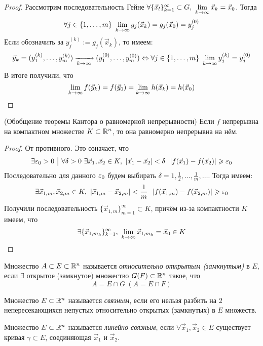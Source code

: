 \begin{proof}
	Рассмотрим последовательность Гейне $\forall \{\vec{x}_l\}_{k = 1}^\infty \subset G,\ \liml_{k \to \infty} \vec{x}_k = \vec{x}_0$. Тогда
	\[
		\forall j \in \{1, \ldots, m\}\ \lim\limits_{k \to \infty} g_j(\vec{x}_k) = g_j(\vec{x}_0) = y_j^{(0)}
	\]
	Если обозначить за $y_j^{(k)} := g_j(\vec{x}_k)$, то имеем:
	\[
		\vec{y}_k = (y_1^{(k)}, \ldots, y_m^{(k)}) \xrightarrow[k \to \infty]{} (y_1^{(0)}, \ldots, y_m^{(0)}) \Leftrightarrow \forall j \in \{1, \ldots, m\}\ \lim\limits_{k \to \infty} y_j^{(k)} = y_j^{(0)}
	\]
	В итоге получили, что
	\[
		\lim\limits_{k \to \infty} f(\vec{y}_k) = f(\vec{y}_0) = \lim\limits_{k \to \infty} h(\vec{x}_k) = h(\vec{x}_0)
	\]
\end{proof}

\begin{theorem} (Обобщение теоремы Кантора о равномерной непрерывности)
	Если $f$ непрерывна на компактном множестве $K \subset \mathbb{R}^n$, то она равномерно непрерывна на нём.
\end{theorem}

\begin{proof}
	От противного. Это означает, что
	\[
		\exists \varepsilon_0 > 0 \ \big|\  \forall \delta > 0\ \exists \vec{x}_1, \vec{x}_2 \in K,\ |\vec{x}_1 - \vec{x}_2| < \delta\ \ |f(\vec{x}_1) - f(\vec{x}_2)| \geqslant \varepsilon_0
	\]
	Последовательно для данного $\varepsilon_0$ будем выбирать $\delta = 1, \frac{1}{2}, \ldots, \frac{1}{m}, \ldots$. Тогда имеем:
	\[
		\exists \vec{x}_{1, m}, \vec{x}_{2, m} \in K,\ |\vec{x}_{1, m} - \vec{x}_{2, m}| < \frac{1}{m}\ \ |f(\vec{x}_{1, m}) - f(\vec{x}_{2, m})| \geqslant \varepsilon_0
	\]
	Получили последовательность $\{\vec{x}_{1, m}\}_{m = 1}^\infty \subset K$, причём из-за компактности $K$ имеем, что
	\[
		\exists \{\vec{x}_{1, m_k}\}_{k = 1}^\infty,\ \lim\limits_{k \to \infty} \vec{x}_{1, m_k} = \vec{x}_0 \in K
	\]
\end{proof}

\begin{definition}
	Множество $A \subset E \subset \mathbb{R}^n$ называется \textit{относительно открытым (замкнутым)} в $E$, если $\exists$ открытое (замкнутое) множество $G (F) \subset \mathbb{R}^n$ такое, что
	\[
		A = E \cap G\ (A = E \cap F)
	\]
\end{definition}

\begin{definition}
	Множество $E \subset \mathbb{R}^n$ называется \textit{связным}, если его нельзя разбить на 2 непересекающихся непустых относительно открытых (замкнутых) в $E$ множеств.
\end{definition}

\begin{definition}
	Множество $E \subset \mathbb{R}^n$ называется \textit{линейно связным}, если $\forall \vec{x}_1, \vec{x}_2 \in E$ существует кривая $\gamma \subset E$, соединяющая $\vec{x}_1$ и $\vec{x}_2$.
\end{definition}